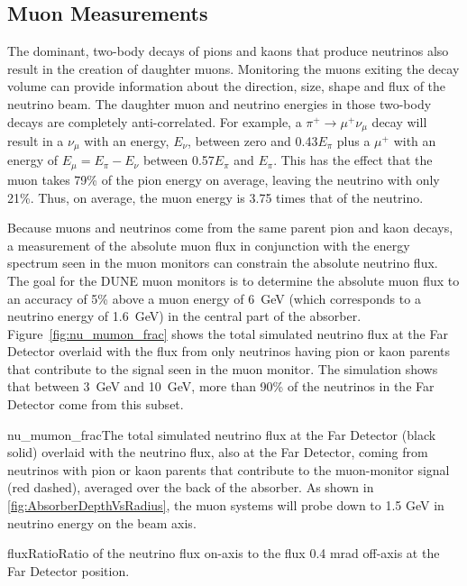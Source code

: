 \subsection{Muon Measurements}
\label{v3ch3-muon-meas}
The dominant, two-body decays of pions and kaons that produce
neutrinos also result in the creation of daughter muons. Monitoring
the muons exiting the decay volume can provide information about the
direction, size, shape and flux of the neutrino beam.  The daughter
muon and neutrino energies in those two-body decays are completely
anti-correlated. For example, a $\pi^+\rightarrow \mu^+\nu_\mu$
decay will result in a $\nu_\mu$ with an energy, $E_\nu$, between
zero and 0.43$E_\pi$ plus a $\mu^+$ with an energy of 
$E_\mu=E_\pi-E_\nu$ between 0.57$E_\pi$ and $E_\pi$. This has the
effect that the muon takes 79\% of the pion energy on average,  
leaving the neutrino with only  21\%. Thus, on average, the
muon energy is 3.75 times that of the neutrino.

Because muons and neutrinos come from the same parent pion and kaon
decays, a measurement of the absolute muon flux in conjunction with the energy spectrum
seen in the muon monitors can constrain the absolute neutrino flux.  The
goal for the DUNE muon monitors is to determine the absolute muon flux
to an accuracy of 5\% above a muon energy of 6~GeV (which corresponds to
a neutrino energy of 1.6~GeV) in the central part of the absorber.
Figure~\ref{fig:nu_mumon_frac} shows the total simulated neutrino flux at the Far Detector overlaid with the flux from only neutrinos having pion or kaon parents that contribute to the signal
seen in the muon monitor.  The simulation shows that between 3~GeV and 10~GeV, more than 90\% of 
the neutrinos in the Far Detector come from this subset.

\begin{cdrfigure}{nu_mumon_frac}{The total simulated neutrino flux at the Far Detector (black solid) overlaid with the neutrino flux, also at the Far Detector, coming from
neutrinos with pion or kaon parents that contribute to the muon-monitor signal (red dashed), averaged over the back of the absorber. As shown in \ref{fig:AbsorberDepthVsRadius}, the muon systems will probe down to 1.5 GeV in neutrino energy on the beam axis.}
\end{cdrfigure}

\begin{cdrfigure}{fluxRatio}{Ratio of the neutrino flux on-axis to the flux 0.4 mrad off-axis at the Far
Detector position.}
\end{cdrfigure}

